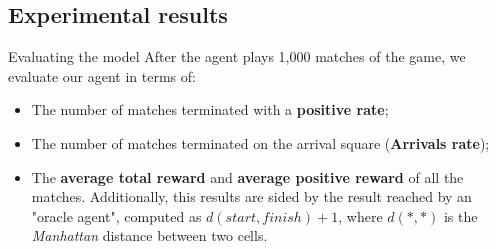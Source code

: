 \documentclass{beamer}
\begin{document}
\subsection{Experimental results}
\begin{frame}{Evaluating the model}
	After the agent plays 1,000 matches of the game, we evaluate our agent in terms of:
	\begin{itemize}
		\item The number of matches terminated with a \textbf{positive rate};
		\item The number of matches terminated on the arrival square (\textbf{Arrivals rate});
		\item The \textbf{average total reward} and \textbf{average positive reward} of all the matches.
		Additionally, this results are sided by the result reached by an "oracle agent", computed as $d(start, finish) + 1$, where $d(*,*)$ is the \textit{Manhattan} distance between two cells.
	\end{itemize} 	


\begin{table}
\end{table}
\end{frame}
\end{document}
